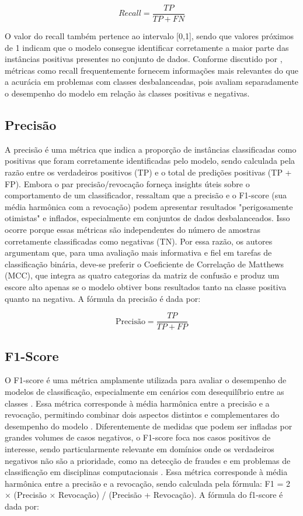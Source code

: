 \documentclass[
    12pt,                %
    openright,           %
    oneside,             %
    a4paper,             %
    english,             %
    brazil               %
]{abntex2}
\begin{document}
\begin{equation}
Recall = \frac{TP}{TP + FN}
\end{equation}

O valor do recall também pertence ao intervalo [0,1], sendo que valores próximos de 1 indicam que o modelo consegue identificar corretamente a maior parte das instâncias positivas presentes no conjunto de dados. Conforme discutido por , métricas como recall frequentemente fornecem informações mais relevantes do que a acurácia em problemas com classes desbalanceadas, pois avaliam separadamente o desempenho do modelo em relação às classes positivas e negativas.

\subsection{Precisão}
A precisão é uma métrica que indica a proporção de instâncias classificadas como positivas que foram corretamente identificadas pelo modelo, sendo calculada pela razão entre os verdadeiros positivos (TP) e o total de predições positivas (TP + FP). Embora o par precisão/revocação forneça insights úteis sobre o comportamento de um classificador,  ressaltam que a precisão e o F1-score (sua média harmônica com a revocação) podem apresentar resultados "perigosamente otimistas" e inflados, especialmente em conjuntos de dados desbalanceados. Isso ocorre porque essas métricas são independentes do número de amostras corretamente classificadas como negativas (TN). Por essa razão, os autores argumentam que, para uma avaliação mais informativa e fiel em tarefas de classificação binária, deve-se preferir o Coeficiente de Correlação de Matthews (MCC), que integra as quatro categorias da matriz de confusão e produz um escore alto apenas se o modelo obtiver bons resultados tanto na classe positiva quanto na negativa. 
A fórmula da precisão é dada por:

\begin{equation}
\text{Precisão} = \frac{TP}{TP + FP}
\end{equation}

\subsection{F1-Score}
O F1-score é uma métrica amplamente utilizada para avaliar o desempenho de modelos de classificação, especialmente em cenários com desequilíbrio entre as classes \cite{Hand2021}. Essa métrica corresponde à média harmônica entre a precisão e a revocação, permitindo combinar dois aspectos distintos e complementares do desempenho do modelo \cite{Hand2021}. Diferentemente de medidas que podem ser infladas por grandes volumes de casos negativos, o F1-score foca nos casos positivos de interesse, sendo particularmente relevante em domínios onde os verdadeiros negativos não são a prioridade, como na detecção de fraudes e em problemas de classificação em disciplinas computacionais \cite{Hand2021}. 
Essa métrica corresponde à média harmônica entre a precisão e a revocação, sendo calculada pela fórmula: F1 = 2 × (Precisão × Revocação) / (Precisão + Revocação).
A fórmula do f1-score é dada por:
\end{document}
